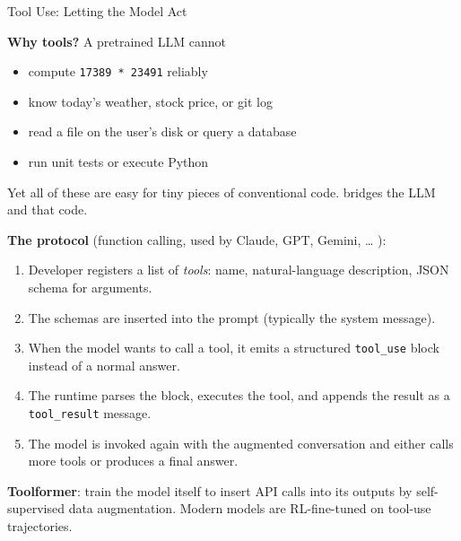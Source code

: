 \begin{frame}{Tool Use: Letting the Model Act}

  \textbf{Why tools?} A pretrained LLM cannot
  \begin{itemize}[nosep]
    \item compute \texttt{17389 * 23491} reliably
    \item know today's weather, stock price, or git log
    \item read a file on the user's disk or query a database
    \item run unit tests or execute Python
  \end{itemize}
  Yet all of these are easy for tiny pieces of conventional code. 
  bridges the LLM and that code.

  \vspace{0.4em}
  \textbf{The protocol} (function calling, used by Claude, GPT, Gemini, \ldots
  \cite{anthropic2024toolUse}):
  \begin{enumerate}[nosep]
    \item Developer registers a list of \emph{tools}: name, natural-language description, JSON schema for arguments.
    \item The schemas are inserted into the prompt (typically the system message).
    \item When the model wants to call a tool, it emits a structured \texttt{tool\_use} block instead of a normal answer.
    \item The runtime parses the block, executes the tool, and appends the result as a \texttt{tool\_result} message.
    \item The model is invoked again with the augmented conversation and either calls more tools or produces a final answer.
  \end{enumerate}

  \vspace{0.3em}
  \cite{schick2023toolformer} \textbf{Toolformer}: train the model itself to insert API calls
  into its outputs by self-supervised data augmentation. Modern models are RL-fine-tuned
  on tool-use trajectories.
\end{frame}

